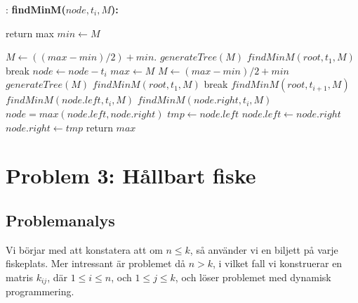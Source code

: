 \documentclass[11pt]{exam}
\begin{document}
\begin{algorithm}
	\caption{: \textbf{findMinM($node, t_i, M$):}}
	\label{alg2}
	\begin{algorithmic} [1]
				\STATE return max
			\ENDIF
			\STATE $min \leftarrow M$ 
			
			\STATE $M \leftarrow ((max - min) / 2) + min$. 
			\STATE $generateTree(M)$ 
			\STATE $findMinM(root, t_1, M)$ 
			\STATE break	
		\ELSE
				\STATE $node \leftarrow node - t_i$ 
					\STATE $max \leftarrow M$ 
					\STATE $M \leftarrow (max - min) / 2 + min$ 			
					\STATE $generateTree(M)$ 
					\STATE $findMinM(root, t_1, M)$ 
					\STATE break
				\ENDIF
				\STATE $findMinM(root,t_{i+1},M)$
			\ELSE
					\STATE $findMinM(node.left, t_i, M)$
					\ELSE
					\STATE $findMinM(node.right, t_i, M)$
					\ENDIF
				\ENDIF
			\STATE $node = max(node.left, node.right)$ 
				\STATE $tmp \leftarrow node.left$
				\STATE $node.left \leftarrow node.right$
				\STATE $node.right \leftarrow tmp$
			\ENDIF
		\ENDIF
	\STATE return $max$ 
	\end{algorithmic}
\end{algorithm}


\newpage
	
\section{Problem 3: Hållbart fiske}

\subsection{Problemanalys}
Vi börjar med att konstatera att om $n \leq k$, så använder vi en biljett på varje fiskeplats. Mer intressant är problemet då $n > k$, i vilket fall vi konstruerar en matris $k_{ij}$, där $1 \leq i \leq n$, och $1 \leq j \leq k$, och löser problemet med dynamisk programmering. 
\end{document}
